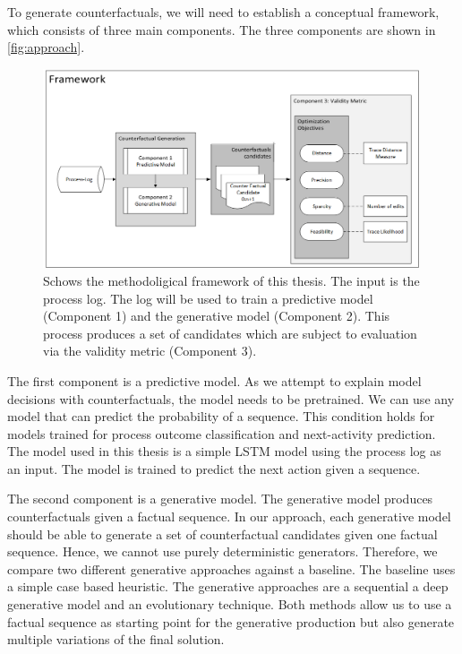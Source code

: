 \documentclass[./../../paper.tex]{subfiles}
\begin{document}
To generate counterfactuals, we will need to establish a conceptual framework, which consists of three main components. The three components are shown in \autoref{fig:approach}. 
\begin{figure}[htb]
    \centering
    \includegraphics[width=0.99\textwidth]{figures/framework.png}
    \caption{Schows the methodoligical framework of this thesis. The input is the process log. The log will be used to train a predictive model (Component 1) and the generative model (Component 2). This process produces a set of candidates which are subject to evaluation via the validity metric (Component 3).}
    \label{fig:approach}
\end{figure}

The first component is a predictive model. As we attempt to explain model decisions with counterfactuals, the model needs to be pretrained. We can use any model that can predict the probability of a sequence. This condition holds for models trained for process outcome classification and next-activity prediction. The model used in this thesis is a simple LSTM model using the process log as an input. The model is trained to predict the next action given a sequence. 

The second component is a generative model. The generative model produces counterfactuals given a factual sequence. In our approach, each generative model should be able to generate a set of counterfactual candidates given one factual sequence. Hence, we cannot use purely deterministic generators. Therefore, we compare two different generative approaches against a baseline. The baseline uses a simple case based heuristic. The  generative approaches are a sequential a deep generative model and an evolutionary technique. Both methods allow us to use a factual sequence as starting point for the generative production but also generate multiple variations of the final solution. 
\end{document}
